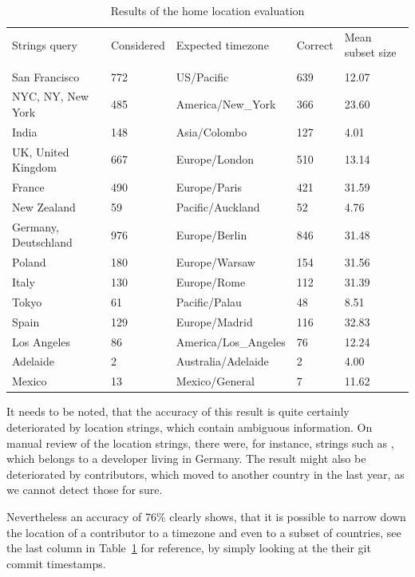 \begin{table}[]
    \centering
    \begin{tabular}{lllll}
        Strings query        & Considered & Expected timezone    & Correct & Mean subset size \\
        & & & & \\
        San Francisco        & 772        & US/Pacific           & 639     & 12.07  \\
        NYC, NY, New York    & 485        & America/New\_York    & 366     & 23.60  \\
        India                & 148        & Asia/Colombo         & 127     & 4.01   \\
        UK, United Kingdom   & 667        & Europe/London        & 510     & 13.14  \\
        France               & 490        & Europe/Paris         & 421     & 31.59  \\
        New Zealand          & 59         & Pacific/Auckland     & 52      & 4.76   \\
        Germany, Deutschland & 976        & Europe/Berlin        & 846     & 31.48  \\
        Poland               & 180        & Europe/Warsaw        & 154     & 31.56  \\
        Italy                & 130        & Europe/Rome          & 112     & 31.39  \\
        Tokyo                & 61         & Pacific/Palau        & 48      & 8.51   \\
        Spain                & 129        & Europe/Madrid        & 116     & 32.83  \\
        Los Angeles          & 86         & America/Los\_Angeles & 76      & 12.24  \\
        Adelaide             & 2          & Australia/Adelaide   & 2       & 4.00   \\
        Mexico               & 13         & Mexico/General       & 7       & 11.62
    \end{tabular}
    \caption{Results of the home location evaluation}\label{home-location-table}
\end{table}

It needs to be noted, that the accuracy of this result is quite certainly deteriorated by location strings, which contain ambiguous information.
On manual review of the location strings, there were, for instance, strings such as , which belongs to a developer living in Germany.
The result might also be deteriorated by contributors, which moved to another country in the last year, as we cannot detect those for sure.

Nevertheless an accuracy of 76\% clearly shows, that it is possible to narrow down the location of a contributor to a timezone and even to a subset of countries, see the last column in Table~\ref{home-location-table} for reference, by simply looking at the their git commit timestamps.
